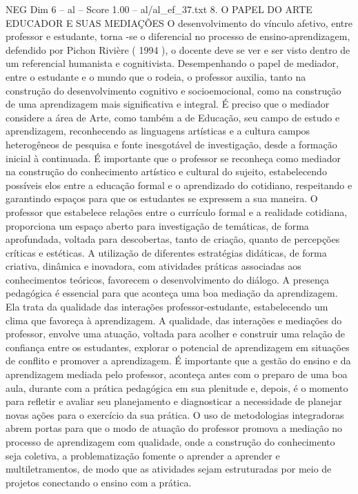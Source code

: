 \begin{textsample}{NEG Dim 6 – al – Score 1.00 – al/al\_ef\_37.txt}  \label{ex:f6_neg_068}
8.
O PAPEL DO ARTE EDUCADOR E SUAS MEDIAÇÕES O desenvolvimento do vínculo afetivo, entre professor e estudante, torna -se o diferencial no processo de ensino-aprendizagem, defendido por Pichon Rivière ( 1994 ), o docente deve se ver e ser visto dentro de um referencial humanista e cognitivista.
Desempenhando o papel de mediador, entre o estudante e o mundo que o rodeia, o professor auxilia, tanto na construção do desenvolvimento cognitivo e socioemocional, como na construção de uma aprendizagem mais significativa e integral.
É preciso que o mediador considere a área de Arte, como também a de Educação, seu campo de estudo e aprendizagem, reconhecendo as linguagens artísticas e a cultura campos heterogêneos de pesquisa e fonte inesgotável de investigação, desde a formação inicial à continuada.
É importante que o professor se reconheça como mediador na construção do conhecimento artístico e cultural do sujeito, estabelecendo possíveis elos entre a educação formal e o aprendizado do cotidiano, respeitando e garantindo espaços para que os estudantes se expressem a sua maneira.
O professor que estabelece relações entre o currículo formal e a realidade cotidiana, proporciona um espaço aberto para investigação de temáticas, de forma aprofundada, voltada para descobertas, tanto de criação, quanto de percepções críticas e estéticas.
A utilização de diferentes estratégias didáticas, de forma criativa, dinâmica e inovadora, com atividades práticas associadas aos conhecimentos teóricos, favorecem o desenvolvimento do diálogo.
A presença pedagógica é essencial para que aconteça uma boa mediação da aprendizagem.
Ela trata da qualidade das interações professor-estudante, estabelecendo um clima que favoreça à aprendizagem.
A qualidade, das interações e mediações do professor, envolve uma atuação, voltada para acolher e construir uma relação de confiança entre os estudantes, explorar o potencial de aprendizagem em situações de conflito e promover a aprendizagem.
É importante que a gestão do ensino e da aprendizagem mediada pelo professor, aconteça antes com o preparo de uma boa aula, durante com a prática pedagógica em sua plenitude e, depois, é o momento para refletir e avaliar seu planejamento e diagnosticar a necessidade de planejar novas ações para o exercício da sua prática.
O uso de metodologias integradoras abrem portas para que o modo de atuação do professor promova a mediação no processo de aprendizagem com qualidade, onde a construção do conhecimento seja coletiva, a problematização fomente o aprender a aprender e multiletramentos, de modo que as atividades sejam estruturadas por meio de projetos conectando o ensino com a prática.

\end{textsample}

